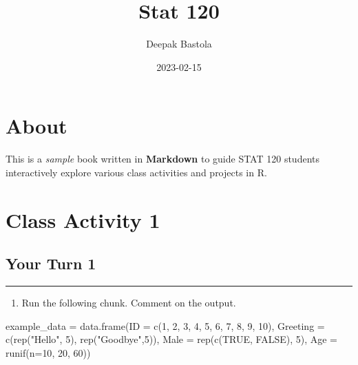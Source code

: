 \documentclass[
]{book}
\title{Stat 120}
\author{Deepak Bastola}
\date{2023-02-15}
\newenvironment{Shaded}{\begin{snugshade}}{\end{snugshade}}
\newcommand{\AttributeTok}[1]{\textcolor[rgb]{0.77,0.63,0.00}{#1}}
\newcommand{\ConstantTok}[1]{\textcolor[rgb]{0.00,0.00,0.00}{#1}}
\newcommand{\DecValTok}[1]{\textcolor[rgb]{0.00,0.00,0.81}{#1}}
\newcommand{\FunctionTok}[1]{\textcolor[rgb]{0.00,0.00,0.00}{#1}}
\newcommand{\NormalTok}[1]{#1}
\newcommand{\OtherTok}[1]{\textcolor[rgb]{0.56,0.35,0.01}{#1}}
\newcommand{\StringTok}[1]{\textcolor[rgb]{0.31,0.60,0.02}{#1}}
\providecommand{\tightlist}{%
  \setlength{\itemsep}{0pt}\setlength{\parskip}{0pt}}
\begin{document}
\maketitle

{
\setcounter{tocdepth}{1}
\tableofcontents
}
\hypertarget{about}{%
\chapter*{About}\label{about}}

This is a \emph{sample} book written in \textbf{Markdown} to guide STAT 120 students interactively explore various class activities and projects in R.

\hypertarget{class-activity-1}{%
\chapter{Class Activity 1}\label{class-activity-1}}

\hypertarget{your-turn-1}{%
\section{Your Turn 1}\label{your-turn-1}}

\begin{center}\rule{0.5\linewidth}{0.5pt}\end{center}

\begin{enumerate}
\def\labelenumi{\alph{enumi}.}
\tightlist
\item
  Run the following chunk. Comment on the output.
\end{enumerate}

\begin{Shaded}
\begin{Highlighting}[]
\NormalTok{example\_data }\OtherTok{=} \FunctionTok{data.frame}\NormalTok{(}\AttributeTok{ID =} \FunctionTok{c}\NormalTok{(}\DecValTok{1}\NormalTok{, }\DecValTok{2}\NormalTok{, }\DecValTok{3}\NormalTok{, }\DecValTok{4}\NormalTok{, }\DecValTok{5}\NormalTok{, }\DecValTok{6}\NormalTok{, }\DecValTok{7}\NormalTok{, }\DecValTok{8}\NormalTok{, }\DecValTok{9}\NormalTok{, }\DecValTok{10}\NormalTok{),}
                          \AttributeTok{Greeting =} \FunctionTok{c}\NormalTok{(}\FunctionTok{rep}\NormalTok{(}\StringTok{"Hello"}\NormalTok{, }\DecValTok{5}\NormalTok{), }\FunctionTok{rep}\NormalTok{(}\StringTok{"Goodbye"}\NormalTok{,}\DecValTok{5}\NormalTok{)),}
                          \AttributeTok{Male =} \FunctionTok{rep}\NormalTok{(}\FunctionTok{c}\NormalTok{(}\ConstantTok{TRUE}\NormalTok{, }\ConstantTok{FALSE}\NormalTok{), }\DecValTok{5}\NormalTok{),}
                          \AttributeTok{Age =} \FunctionTok{runif}\NormalTok{(}\AttributeTok{n=}\DecValTok{10}\NormalTok{, }\DecValTok{20}\NormalTok{, }\DecValTok{60}\NormalTok{))}
\end{Highlighting}
\end{Shaded}
\end{document}

